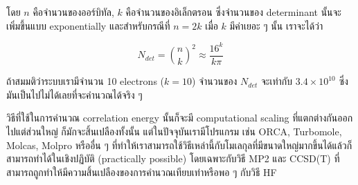 \noindent โดย $n$ คือจำนวนของออร์บิทัล, $k$ คือจำนวนของอิเล็กตรอน ซึ่งจำนวนของ determinant 
นั้นจะเพิ่มขึ้นแบบ exponentially และสำหรับกรณีที่ $n = 2k$ เมื่อ $k$ มีค่าเยอะ ๆ นั้น เราจะได้ว่า 

\begin{equation}
    N_{det} = \binom{n}{k}^{2} \approx \frac{16^k}{k\pi}
\end{equation}

ถ้าสมมติว่าระบบเรามีจำนวน 10 electrons ($k = 10$) จำนวนของ $N_{det}$ จะเท่ากับ $3.4 \times 10^{10}$ 
ซึ่งมันเป็นไปไม่ได้เลยที่จะคำนวณได้จริง ๆ

วิธีที่ใช้ในการคำนวณ correlation energy นั้นก็จะมี computational scaling ที่แตกต่างกันออกไปแต่ส่วนใหญ่%
ก็มักจะสิ้นเปลืองทั้งนั้น แต่ในปัจจุบันเรามีโปรแกรม เช่น ORCA, Turbomole, Molcas, Molpro หรืออื่น ๆ 
ที่ทำให้เราสามารถใช้วิธีเหล่านี้กับโมเลกุลที่มีขนาดใหญ่มากขึ้นได้แล้วก็สามารถทำได้ในเชิงปฏิบัติ (practically possible)
โดยเฉพาะกับวิธี MP2 และ CCSD(T) ที่สามารถถูกทำให้มีความสิ้นเปลืองของการคำนวณเทียบเท่าหรือพอ ๆ กับวิธี HF 


